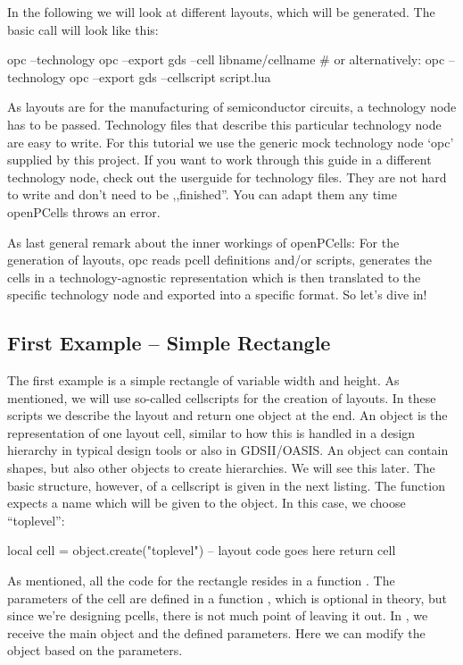 In the following we will look at different layouts, which will be generated.
The basic call will look like this:
\begin{shellcode}
    opc --technology opc --export gds --cell libname/cellname
    # or alternatively:
    opc --technology opc --export gds --cellscript script.lua
\end{shellcode}
As layouts are for the manufacturing of semiconductor circuits, a technology node has to be passed.
Technology files that describe this particular technology node are easy to write.
For this tutorial we use the generic mock technology node `opc' supplied by this project.
If you want to work through this guide in a different technology node, check out the userguide for technology files.
They are not hard to write and don't need to be ,,finished''.
You can adapt them any time openPCells throws an error.

As last general remark about the inner workings of openPCells: For the generation of layouts, opc reads pcell definitions and/or scripts, generates the cells in a technology-agnostic representation which is then translated to the specific technology node and exported into a specific format.
So let's dive in!

\subsection{First Example -- Simple Rectangle}
The first example is a simple rectangle of variable width and height.
As mentioned, we will use so-called cellscripts for the creation of layouts.
In these scripts we describe the layout and return one object at the end.
An object is the representation of one layout cell, similar to how this is handled in a design hierarchy in typical design tools or also in GDSII/OASIS.
An object can contain shapes, but also other objects to create hierarchies.
We will see this later.
The basic structure, however, of a cellscript is given in the next listing.
The  function expects a name which will be given to the object.
In this case, we choose \enquote{toplevel}:
\begin{lualisting}
    local cell = object.create("toplevel")
    -- layout code goes here
    return cell
\end{lualisting}

As mentioned, all the code for the rectangle resides in a function .
The parameters of the cell are defined in a function , which is optional in theory, but since we're designing pcells, there is not much point
of leaving it out.
In , we receive the main object and the defined parameters.
Here we can modify the object based on the parameters.

